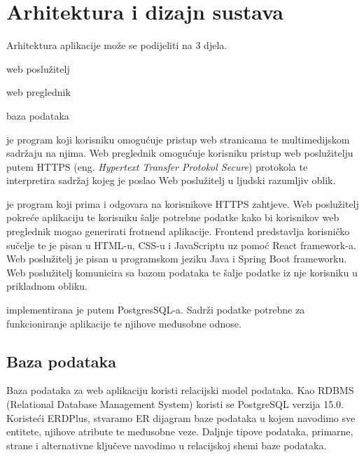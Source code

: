 \chapter{Arhitektura i dizajn sustava}
		


	
	Arhitektura aplikacije može se podijeliti na 3 djela. 
	
	\begin{packed_item}
		\item web poslužitelj
		
		\item web preglednik
		
		\item baza podataka
	
	\end{packed_item}
	
	 je program koji korisniku omogućuje pristup web stranicama te multimedijskom sadržaju na njima. Web preglednik omogućuje korisniku pristup web poslužitelju putem HTTPS (eng. \textit{Hypertext Transfer Protokol Secure}) protokola te interpretira sadržaj kojeg je poslao Web poslužitelj u ljudski razumljiv oblik.
	
	 je program koji prima i odgovara na korisnikove HTTPS zahtjeve. Web poslužitelj pokreće aplikaciju te korisniku šalje potrebne podatke kako bi korisnikov web preglednik mogao generirati frotnend aplikacije. Frontend predstavlja korisničko sučelje te je pisan u HTML-u, CSS-u i JavaScriptu uz pomoć React framework-a. Web poslužitelj je pisan u programskom jeziku Java i Spring Boot frameworku. Web poslužitelj komunicira sa bazom podataka te šalje podatke iz nje korisniku u prikladnom obliku.
	
	 implementirana je putem PostgresSQL-a. Sadrži podatke potrebne za funkcioniranje aplikacije te njihove međusobne odnose. 

	
		

	
				
		\section{Baza podataka}
			
		
			
		Baza podataka za web aplikaciju koristi relacijski model podataka. Kao RDBMS (Relational Database Management System) koristi se PostgreSQL verzija 15.0. Koristeći ERDPlus, stvaramo ER dijagram baze podataka u kojem navodimo sve entitete, njihove atribute te međusobne veze. Daljnje tipove podataka, primarne, strane i alternativne ključeve navodimo u relacijskoj shemi baze podataka.
		
